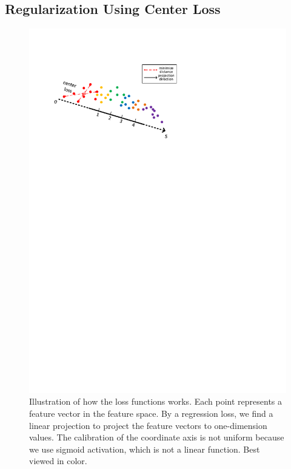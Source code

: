 \documentclass{article}
\begin{document}
\subsection{Regularization Using Center Loss} \label{sec:cls}
\vspace{-2mm}
\begin{figure}[!t]
    \centering
    \includegraphics[scale=0.85]{figures/classification_loss.pdf}
    \caption{Illustration of how the loss functions works. Each point represents a feature vector in the feature space. By a regression loss, we find a linear projection to project the feature vectors to one-dimension values. The calibration of the coordinate axis is not uniform because we use sigmoid activation, which is not a linear function. Best viewed in color.
    }
    \label{fig:projection}
\end{figure}
\end{document}

